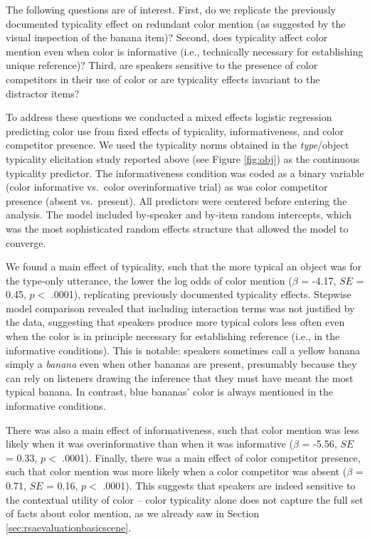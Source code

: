 \documentclass[11pt]{article}
\newcommand{\figref}[1]{Figure \ref{#1}}
\newcommand{\sectionref}[1]{Section \ref{#1}}
\begin{document}
The following questions are of interest. First, do we replicate the previously documented typicality effect on redundant color mention (as suggested by the visual inspection of the banana item)? Second, does typicality affect color mention even when color is informative (i.e., technically necessary for establishing unique reference)? Third, are speakers sensitive to the presence of color competitors in their use of color or are typicality effects invariant to the distractor items?

To address these questions we conducted a mixed effects logistic regression predicting color use from fixed effects of typicality, informativeness, and color competitor presence. We used the typicality norms obtained in the \emph{type}/object typicality elicitation study reported above (see \figref{fig:obj}) as the continuous typicality predictor. The informativeness condition was coded as a binary variable (color informative vs.~color overinformative trial) as was color competitor presence (absent vs.~present). All predictors were centered before entering the analysis. The model included by-speaker and by-item random intercepts, which was the most sophisticated random effects structure that allowed the model to converge.

We found a main effect of typicality, such that the more typical an object was for the type-only utterance, the lower the log odds of color mention ($\beta$ = -4.17, $SE$ = 0.45, $p <$ .0001), replicating previously documented typicality effects. Stepwise model comparison revealed that including interaction terms was not justified by the data, suggesting that speakers produce more typical colors less often even when the color is in principle necessary for establishing reference (i.e., in the informative conditions). This is notable: speakers sometimes call a yellow banana simply a \emph{banana} even when other bananas are present, presumably because they can rely on listeners drawing the inference that they must have meant the most typical banana. In contrast, blue bananas' color is always mentioned in the informative conditions.

There was also a main effect of informativeness, such that color mention was less likely when it was overinformative than when it was informative ($\beta$ = -5.56, $SE$ = 0.33, $p <$ .0001). Finally, there was a main effect of color competitor presence, such that color mention was more likely when a color competitor was absent  ($\beta$ = 0.71, $SE$ = 0.16, $p <$ .0001). This suggests that speakers are indeed sensitive to the contextual utility of color -- color typicality alone does not capture the full set of facts about color mention, as we already saw in \sectionref{sec:rsaevaluationbasicscene}.
\end{document}
